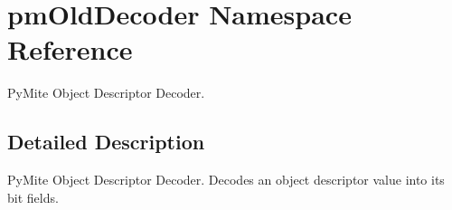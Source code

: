 \hypertarget{namespacepm_old_decoder}{\section{pm\-Old\-Decoder Namespace Reference}
\label{namespacepm_old_decoder}
}


Py\-Mite Object Descriptor Decoder.  




\subsection{Detailed Description}
Py\-Mite Object Descriptor Decoder. Decodes an object descriptor value into its bit fields. 